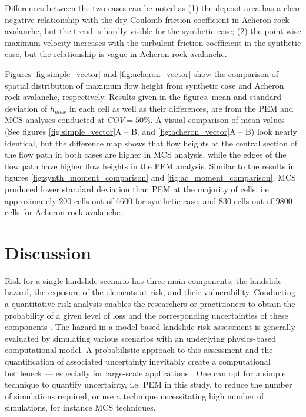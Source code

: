 \documentclass[utf8]{FrontiersinHarvard}
\begin{document}
Differences between the two cases can be noted as (1) the deposit area has a clear negative relationship with the dry-Coulomb friction coefficient in Acheron rock avalanche, but the trend is hardly visible for the synthetic case; (2) the point-wise maximum velocity increases with the turbulent friction coefficient in the synthetic case, but the relationship is vague in Acheron rock avalanche.

Figures \ref{fig:simple_vector} and \ref{fig:acheron_vector} show the comparison of spatial distribution of maximum flow height from synthetic case and Acheron rock avalanche, respectively. Results given in the figures, mean and standard deviation of $h_{max}$ in each cell as well as their differences, are from the PEM and MCS analyses conducted at $COV = 50\%$. A visual comparison of mean values (See figures \ref{fig:simple_vector}A -- B, and \ref{fig:acheron_vector}A -- B) look nearly identical, but the difference map shows that flow heights at the central section of the flow path in both cases are higher in MCS analysis, while the edges of the flow path have higher flow heights in the PEM analysis. Similar to the results in figures \ref{fig:synth_moment_comparison} and \ref{fig:ac_moment_comparison}, MCS produced lower standard deviation than PEM at the majority of cells, i.e approximately 200 cells out of 6600 for synthetic case, and 830 cells out of 9800 cells for Acheron rock avalanche.

\section{Discussion}
\label{sec:discussion}

Risk for a single landslide scenario has three main components: the landslide hazard, the exposure of the elements at risk, and their vulnerability. Conducting a quantitative risk analysis enables the researchers or practitioners to obtain the probability of a given level of loss and the corresponding uncertainties of these components \citep{Eidsvig2014,Corominas2013}. The hazard in a model-based landslide risk assessment is generally evaluated by simulating various scenarios with an underlying physics-based computational model. A probabilistic approach to this assessment and the quantification of associated uncertainty inevitably create a computational bottleneck --- especially for large-scale applications \citep{Strauch2018,Jiang2022}. One can opt for a simple technique to quantify uncertainty, i.e. PEM in this study, to reduce the number of simulations required, or use a technique necessitating high number of simulations, for instance MCS techniques.
\end{document}

